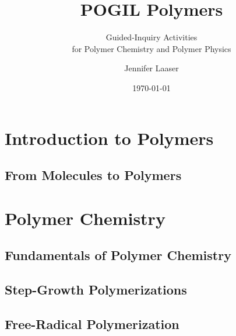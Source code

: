 \documentclass[book]{pogil}
\author{Jennifer Laaser}
\title{POGIL Polymers}
\subtitle{Guided-Inquiry Activities \\for Polymer Chemistry and Polymer Physics}
\date{\today}
\begin{document}
\frontmatter
\pagestyle{empty}
\titlepage
\clearpage

\copyrightpage
\clearpage

\tableofcontents*
\clearpage



\mainmatter
\pagestyle{fancy}

\part{Introduction to Polymers}

	\chapter{From Molecules to Polymers}
		
		
		

\part{Polymer Chemistry}

	\chapter{Fundamentals of Polymer Chemistry}
		

	\chapter{Step-Growth Polymerizations}
		
		
		
		
		

	\chapter{Free-Radical Polymerization}
		
		
\end{document}
